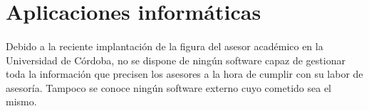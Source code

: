 \section{Aplicaciones informáticas}

\paragraph{}Debido a la reciente implantación de la figura del asesor académico
en la Universidad de Córdoba, no se dispone de ningún software capaz de
gestionar toda la información que precisen los asesores a la hora de cumplir
con su labor de asesoría. Tampoco se conoce ningún software externo cuyo
cometido sea el mismo.